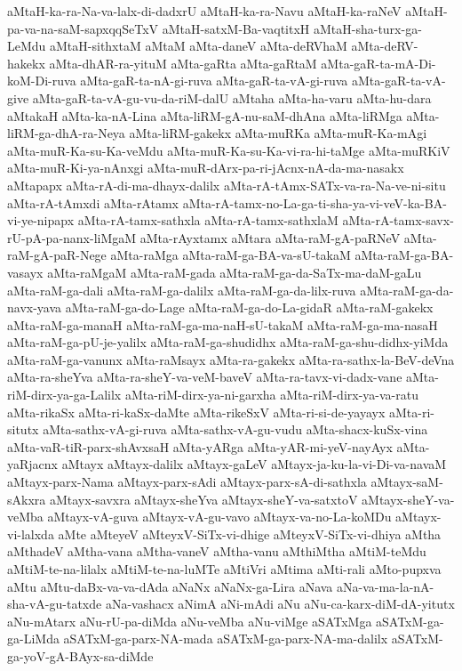 {aMtaH-ka-ra-Na-va-lalx-di-dadxrU
aMtaH-ka-ra-Navu
aMtaH-ka-raNeV
aMtaH-pa-va-na-saM-sapxqqSeTxV
aMtaH-satxM-Ba-vaqtitxH
aMtaH-sha-turx-ga-LeMdu
aMtaH-sithxtaM
aMtaM
aMta-daneV
aMta-deRVhaM
aMta-deRV-hakekx
aMta-dhAR-ra-yituM
aMta-gaRta
aMta-gaRtaM
aMta-gaR-ta-mA-Di-koM-Di-ruva
aMta-gaR-ta-nA-gi-ruva
aMta-gaR-ta-vA-gi-ruva
aMta-gaR-ta-vA-give
aMta-gaR-ta-vA-gu-vu-da-riM-dalU
aMtaha
aMta-ha-varu
aMta-hu-dara
aMtakaH
aMta-ka-nA-Lina
aMta-liRM-gA-nu-saM-dhAna
aMta-liRMga
aMta-liRM-ga-dhA-ra-Neya
aMta-liRM-gakekx
aMta-muRKa
aMta-muR-Ka-mAgi
aMta-muR-Ka-su-Ka-veMdu
aMta-muR-Ka-su-Ka-vi-ra-hi-taMge
aMta-muRKiV
aMta-muR-Ki-ya-nAnxgi
aMta-muR-dArx-pa-ri-jAcnx-nA-da-ma-nasakx
aMtapapx
aMta-rA-di-ma-dhayx-dalilx
aMta-rA-tAmx-SATx-va-ra-Na-ve-ni-situ
aMta-rA-tAmxdi
aMta-rAtamx
aMta-rA-tamx-no-La-ga-ti-sha-ya-vi-veV-ka-BA-vi-ye-nipapx
aMta-rA-tamx-sathxla
aMta-rA-tamx-sathxlaM
aMta-rA-tamx-savx-rU-pA-pa-nanx-liMgaM
aMta-rAyxtamx
aMtara
aMta-raM-gA-paRNeV
aMta-raM-gA-paR-Nege
aMta-raMga
aMta-raM-ga-BA-va-sU-takaM
aMta-raM-ga-BA-vasayx
aMta-raMgaM
aMta-raM-gada
aMta-raM-ga-da-SaTx-ma-daM-gaLu
aMta-raM-ga-dali
aMta-raM-ga-dalilx
aMta-raM-ga-da-lilx-ruva
aMta-raM-ga-da-navx-yava
aMta-raM-ga-do-Lage
aMta-raM-ga-do-La-gidaR
aMta-raM-gakekx
aMta-raM-ga-manaH
aMta-raM-ga-ma-naH-sU-takaM
aMta-raM-ga-ma-nasaH
aMta-raM-ga-pU-je-yalilx
aMta-raM-ga-shudidhx
aMta-raM-ga-shu-didhx-yiMda
aMta-raM-ga-vanunx
aMta-raMsayx
aMta-ra-gakekx
aMta-ra-sathx-la-BeV-deVna
aMta-ra-sheYva
aMta-ra-sheY-va-veM-baveV
aMta-ra-tavx-vi-dadx-vane
aMta-riM-dirx-ya-ga-Lalilx
aMta-riM-dirx-ya-ni-garxha
aMta-riM-dirx-ya-va-ratu
aMta-rikaSx
aMta-ri-kaSx-daMte
aMta-rikeSxV
aMta-ri-si-de-yayayx
aMta-ri-situtx
aMta-sathx-vA-gi-ruva
aMta-sathx-vA-gu-vudu
aMta-shacx-kuSx-vina
aMta-vaR-tiR-parx-shAvxsaH
aMta-yARga
aMta-yAR-mi-yeV-nayAyx
aMta-yaRjacnx
aMtayx
aMtayx-dalilx
aMtayx-gaLeV
aMtayx-ja-ku-la-vi-Di-va-navaM
aMtayx-parx-Nama
aMtayx-parx-sAdi
aMtayx-parx-sA-di-sathxla
aMtayx-saM-sAkxra
aMtayx-savxra
aMtayx-sheYva
aMtayx-sheY-va-satxtoV
aMtayx-sheY-va-veMba
aMtayx-vA-guva
aMtayx-vA-gu-vavo
aMtayx-va-no-La-koMDu
aMtayx-vi-lalxda
aMte
aMteyeV
aMteyxV-SiTx-vi-dhige
aMteyxV-SiTx-vi-dhiya
aMtha
aMthadeV
aMtha-vana
aMtha-vaneV
aMtha-vanu
aMthiMtha
aMtiM-teMdu
aMtiM-te-na-lilalx
aMtiM-te-na-luMTe
aMtiVri
aMtima
aMti-rali
aMto-pupxva
aMtu
aMtu-daBx-va-va-dAda
aNaNx
aNaNx-ga-Lira
aNava
aNa-va-ma-la-nA-sha-vA-gu-tatxde
aNa-vashacx
aNimA
aNi-mAdi
aNu
aNu-ca-karx-diM-dA-yitutx
aNu-mAtarx
aNu-rU-pa-diMda
aNu-veMba
aNu-viMge
aSATxMga
aSATxM-ga-ga-LiMda
aSATxM-ga-parx-NA-mada
aSATxM-ga-parx-NA-ma-dalilx
aSATxM-ga-yoV-gA-BAyx-sa-diMde
}

